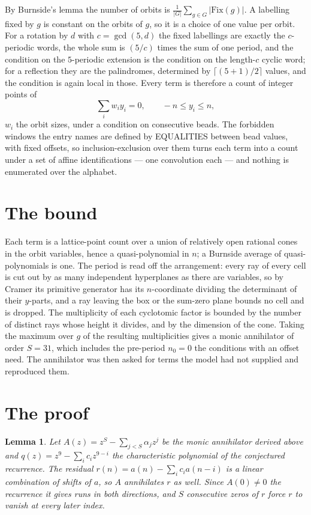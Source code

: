 \documentclass[11pt,a4paper]{article}
\theoremstyle{plain}
\newtheorem{lemma}[theorem]{Lemma}
\theoremstyle{definition}
\begin{document}
By Burnside's lemma the number of orbits is $\frac{1}{|G|}\sum_{g\in G}|\mathrm{Fix}(g)|$.
A labelling fixed by $g$ is constant on the orbits of $g$, so it is a choice of one value per
orbit. For a rotation by $d$ with $c=\gcd(5,d)$ the fixed labellings are exactly the
$c$-periodic words, the whole sum is $(5/c)$ times the sum of one period, and the condition on
the $5$-periodic extension is the condition on the length-$c$ cyclic word; for a reflection
they are the palindromes, determined by $\lceil(5+1)/2\rceil$ values, and the condition is
again local in those. Every term is therefore a count of integer points of
\[
\sum_i w_i y_i = 0, \qquad -n \le y_i \le n,
\]
$w_i$ the orbit sizes, under a condition on consecutive beads. The forbidden windows the entry
names are defined by EQUALITIES between bead values, with fixed offsets, so inclusion-exclusion
over them turns each term into a count under a set of affine identifications --- one
convolution each --- and nothing is enumerated over the alphabet.

\section{The bound}

Each term is a lattice-point count over a union of relatively open rational cones in the orbit
variables, hence a quasi-polynomial in $n$; a Burnside average of quasi-polynomials is one. The
period is read off the arrangement: every ray of every cell is cut out by as many independent
hyperplanes as there are variables, so by Cramer its primitive generator has its $n$-coordinate
dividing the determinant of their $y$-parts, and a ray leaving the box or the sum-zero plane
bounds no cell and is dropped. The multiplicity of each cyclotomic factor is bounded by the
number of distinct rays whose height it divides, and by the dimension of the cone. Taking the
maximum over $g$ of the resulting multiplicities gives a monic annihilator of order
$S=31$, which includes the pre-period $n_0=0$ the conditions with an offset need. The
annihilator was then asked for terms the model had not supplied and reproduced them.

\section{The proof}

\begin{lemma}\label{lem:crit}
Let $A(z)=z^S-\sum_{j<S}\alpha_jz^{j}$ be the monic annihilator derived above and
$q(z)=z^{9}-\sum_ic_iz^{9-i}$ the characteristic polynomial of the conjectured
recurrence. The residual $r(n)=a(n)-\sum_ic_ia(n-i)$ is a linear combination of shifts of $a$,
so $A$ annihilates $r$ as well. Since $A(0)\ne0$ the recurrence it gives runs in both
directions, and $S$ consecutive zeros of $r$ force $r$ to vanish at every later index.
\end{lemma}
\end{document}
